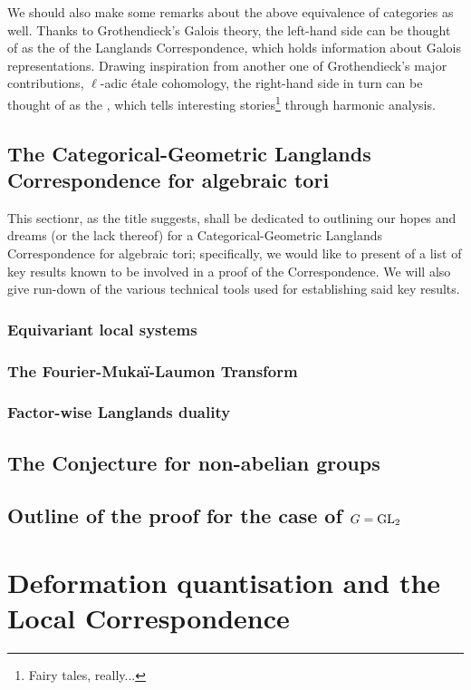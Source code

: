        
        We should also make some remarks about the above equivalence of categories as well. Thanks to Grothendieck's Galois theory, the left-hand side can be thought of as the  of the Langlands Correspondence, which holds information about Galois representations. Drawing inspiration from another one of Grothendieck's major contributions, $\ell$-adic \'etale cohomology, the right-hand side in turn can be thought of as the , which tells interesting stories\footnote{Fairy tales, really...} through harmonic analysis.
    
        \subsection{The Categorical-Geometric Langlands Correspondence for algebraic tori}
            This sectionr, as the title suggests, shall be dedicated to outlining our hopes and dreams (or the lack thereof) for a Categorical-Geometric Langlands Correspondence for algebraic tori; specifically, we would like to present of a list of key results known to be involved in a proof of the Correspondence. We will also give run-down of the various technical tools used for establishing said key results. 
            
            \subsubsection{Equivariant local systems}
        
            \subsubsection{The Fourier-Muka\"i-Laumon Transform}
            
            \subsubsection{Factor-wise Langlands duality}
            
        \subsection{The Conjecture for non-abelian groups}
        
        \subsection{Outline of the proof for the case of \texorpdfstring{$G = \operatorname{GL}_2$}{}}
    
    \section{Deformation quantisation and the Local Correspondence}